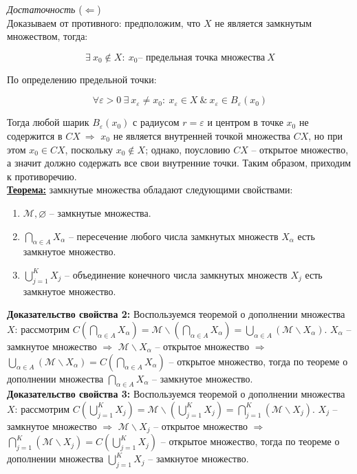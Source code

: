 \documentclass[a4paper,12pt]{article} %
\begin{document}
\textit{Достаточность} ($\Leftarrow$)\\

Доказываем от противного: предположим, что $X$ не является замкнутым множеством, тогда:

\[ \exists ~ x_0 \notin X : ~ x_0 \text{-- предельная точка множества} ~ X \]

По определению предельной точки:

\[ \forall \varepsilon > 0 ~ \exists ~ x_{\varepsilon} \neq x_0 : ~ x_{\varepsilon} \in X ~ \& ~ x_{\varepsilon} \in B_{\varepsilon}(x_0) \]

Тогда любой шарик $B_{\varepsilon}(x_0)$ с радиусом $r = \varepsilon$ и центром в точке $x_0$ не содержится в $CX ~ \Rightarrow$ $x_0$ не является внутренней точкой множества $CX$, но при этом $x_0 \in CX$, поскольку $x_0 \notin X$; однако, поусловию $CX$ -- открытое множество, а значит должно содержать все свои внутренние точки. Таким образом, приходим к противоречию.\\

\underline{\textbf{Теорема:}} замкнутые множества обладают следующими свойствами:

\begin{enumerate}
    \item $\mathscr{M}, \varnothing$ -- замкнутые множества.
    \item $\bigcap \limits_{\alpha \in A} X_{\alpha}$ -- пересечение любого числа замкнутых множеств $X_{\alpha}$ есть замкнутое множество.
    \item $\bigcup \limits_{j = 1}^K X_j$ -- объединение конечного числа замкнутых множеств $X_j$ есть замкнутое множество.
\end{enumerate}

\textbf{Доказательство свойства 2:} Воспользуемся теоремой о дополнении множества $X$: рассмотрим $C(\bigcap \limits_{\alpha \in A} X_{\alpha}) = \mathscr{M} \backslash (\bigcap \limits_{\alpha \in A} X_{\alpha}) = \bigcup \limits_{\alpha \in A} (\mathscr{M} \backslash X_{\alpha})$. $X_{\alpha}$ -- замкнутое множество $\Rightarrow$ $\mathscr{M} \backslash X_{\alpha}$ -- открытое множество $\Rightarrow$ $\bigcup \limits_{\alpha \in A} (\mathscr{M} \backslash X_{\alpha}) = C(\bigcap \limits_{\alpha \in A} X_{\alpha})$ -- открытое множество, тогда по теореме о дополнении множества $\bigcap \limits_{\alpha \in A} X_{\alpha}$ -- замкнутое множество.\\

\textbf{Доказательство свойства 3:} Воспользуемся теоремой о дополнении множества $X$: рассмотрим $C(\bigcup \limits_{j = 1}^K X_j) = \mathscr{M} \backslash (\bigcup \limits_{j = 1}^K X_j) = \bigcap \limits_{j=1}^K (\mathscr{M} \backslash X_j)$. $X_j$ -- замкнутое множество $\Rightarrow$ $\mathscr{M} \backslash X_j$ -- открытое множество $\Rightarrow$ $\bigcap \limits_{j=1}^K (\mathscr{M} \backslash X_j) = C(\bigcup \limits_{j = 1}^K X_j)$ -- открытое множество, тогда по теореме о дополнении множества $\bigcup \limits_{j = 1}^K X_j$ -- замкнутое множество.\\
\end{document}
